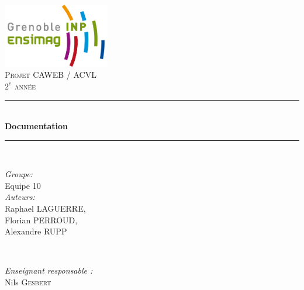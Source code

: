 \documentclass[12pt]{report}
\begin{document}
\begin{titlepage}

\newcommand{\quotes}[1]{``#1''}

\newcommand{\HRule}{\rule{\linewidth}{0.5mm}} %
 
$~~$
\\[-3cm]
\includegraphics[width=0.35\textwidth]{./ressources/logo-ensimag.jpg}\\ [2cm]

\center %
\textsc{\LARGE Projet CAWEB / ACVL}\\[0.5cm] %
\textsc{\Large $2^{e}$ année}\\[1.5cm] %



\HRule \\[0.8cm]
{ \huge \bfseries Documentation}\\[0.4cm] %
\HRule \\[1.0cm]
 

\begin{minipage}{0.4\textwidth}
\begin{flushleft} \large
\emph{Groupe:}\\
Equipe 10 \\[0.8cm]
\emph{Auteurs:}\\
Raphael \textsc{LAGUERRE},\\ Florian \textsc{PERROUD},\\ Alexandre \textsc{RUPP}\\%
\end{flushleft}
\end{minipage}
~
\begin{minipage}{0.4\textwidth}
\begin{flushright} \large
\emph{Enseignant responsable :} \\
 Nils \textsc{Gesbert} %
\end{flushright}
\end{minipage}\\[3cm]


\end{titlepage}
\end{document}
